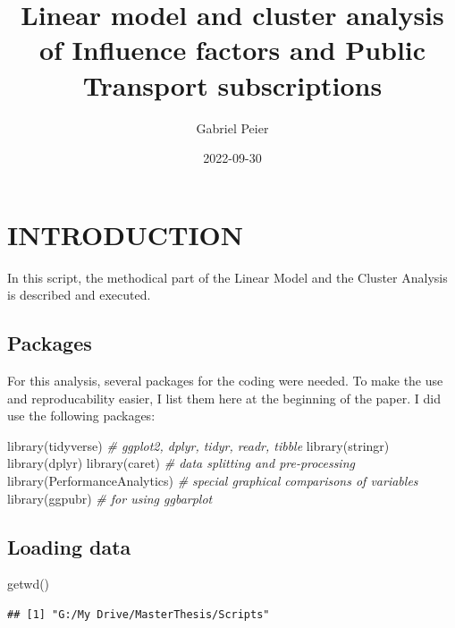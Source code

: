 \documentclass[
]{article}
\title{Linear model and cluster analysis of Influence factors and Public
Transport subscriptions}
\author{Gabriel Peier}
\date{2022-09-30}
\newenvironment{Shaded}{\begin{snugshade}}{\end{snugshade}}
\newcommand{\CommentTok}[1]{\textcolor[rgb]{0.56,0.35,0.01}{\textit{#1}}}
\newcommand{\FunctionTok}[1]{\textcolor[rgb]{0.00,0.00,0.00}{#1}}
\newcommand{\NormalTok}[1]{#1}
\begin{document}
\maketitle

\hypertarget{introduction}{%
\section{INTRODUCTION}\label{introduction}}

In this script, the methodical part of the Linear Model and the Cluster
Analysis is described and executed.

\hypertarget{packages}{%
\subsection{Packages}\label{packages}}

For this analysis, several packages for the coding were needed. To make
the use and reproducability easier, I list them here at the beginning of
the paper. I did use the following packages:

\begin{Shaded}
\begin{Highlighting}[]
\FunctionTok{library}\NormalTok{(tidyverse)             }\CommentTok{\# ggplot2, dplyr, tidyr, readr, tibble}
\FunctionTok{library}\NormalTok{(stringr)}
\FunctionTok{library}\NormalTok{(dplyr)}
\FunctionTok{library}\NormalTok{(caret)                 }\CommentTok{\# data splitting and pre{-}processing}
\FunctionTok{library}\NormalTok{(PerformanceAnalytics)  }\CommentTok{\# special graphical comparisons of variables}
\FunctionTok{library}\NormalTok{(ggpubr)                }\CommentTok{\# for using ggbarplot}
\end{Highlighting}
\end{Shaded}

\hypertarget{loading-data}{%
\subsection{Loading data}\label{loading-data}}

\begin{Shaded}
\begin{Highlighting}[]
\FunctionTok{getwd}\NormalTok{()}
\end{Highlighting}
\end{Shaded}

\begin{verbatim}
## [1] "G:/My Drive/MasterThesis/Scripts"
\end{verbatim}
\end{document}
